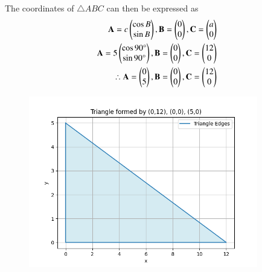 \documentclass[journal]{IEEEtran}
\begin{document}
The coordinates of $\triangle ABC$ can then be expressed as
\begin{align}
    \mathbf{A} = c\begin{pmatrix}\cos{B} \\ \sin{B}\end{pmatrix}, \mathbf{B} = \begin{pmatrix}0 \\ 0\end{pmatrix}, \mathbf{C} = \begin{pmatrix}a \\ 0\end{pmatrix}\\
     \mathbf{A} = 5\begin{pmatrix}\cos{90\degree} \\ \sin{90\degree}\end{pmatrix}, \mathbf{B} = \begin{pmatrix}0 \\ 0\end{pmatrix}, \mathbf{C} = \begin{pmatrix} 12\\ 0\end{pmatrix} \\
    \therefore \mathbf{A} = \begin{pmatrix}0 \\ 5\end{pmatrix}, \mathbf{B} = \begin{pmatrix}0 \\ 0\end{pmatrix}, \mathbf{C} = \begin{pmatrix} 12\\ 0\end{pmatrix}   
\end{align}
\begin{figure}
    \centering
    \includegraphics[width=10cm]{figs/fig.png}
    \caption{}
    \label{fig:enter-label}
\end{figure}
\end{document}
